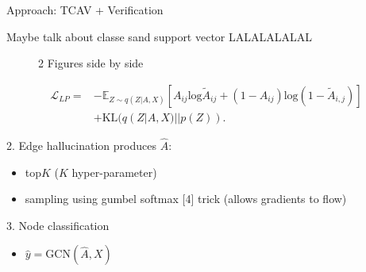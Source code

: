 \documentclass[final]{beamer}
\begin{document}
\begin{frame}[fragile]{}
\begin{textblock}{\colwidth}
\begin{paddedBlock}{Approach: TCAV + Verification}

\alert{Maybe talk about classe sand support vector}
LALALALALAL

\begin{figure}%
    \centering
    \qquad
    \caption{2 Figures side by side}%
    \label{fig:example}%
\end{figure}


\begin{align*}
\mathcal{L}_{LP}=&-\mathbb{E}_{Z\sim q(Z|A,X)}[A_{ij}\mathrm{log}\tilde{A}_{ij}+(1-A_{ij})\mathrm{log}(1-\tilde{A}_{i,j})]\\
&+\mathrm{KL}(q(Z|A,X)||p(Z)).
\end{align*}

\alert{2. Edge hallucination}
  produces $\hat{A}$:
  \begin{itemize}
    \item top$K$ ($K$ hyper-parameter)
    \item sampling using gumbel softmax [4] trick (allows gradients to flow)
  \end{itemize}
\alert{3. Node classification}
\begin{itemize}
	\item $\hat{y} = \mathrm{GCN}(\hat{A}, X)$
\end{itemize}

\end{paddedBlock}
\end{textblock}



\end{frame}
\end{document}
